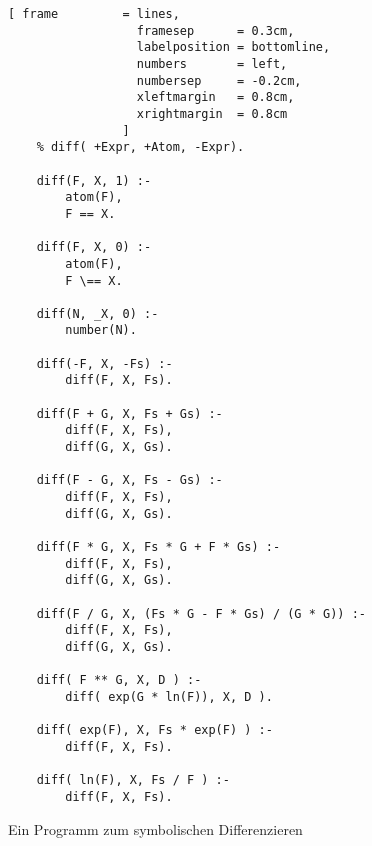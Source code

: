 \begin{figure}[!h]
  \centering
\begin{Verbatim}[ frame         = lines, 
                  framesep      = 0.3cm, 
                  labelposition = bottomline,
                  numbers       = left,
                  numbersep     = -0.2cm,
                  xleftmargin   = 0.8cm,
                  xrightmargin  = 0.8cm
                ]
    % diff( +Expr, +Atom, -Expr).
    
    diff(F, X, 1) :- 
        atom(F), 
        F == X.
    
    diff(F, X, 0) :- 
        atom(F),
        F \== X.
        
    diff(N, _X, 0) :-
        number(N).
    
    diff(-F, X, -Fs) :-
        diff(F, X, Fs).
    
    diff(F + G, X, Fs + Gs) :-
        diff(F, X, Fs),
        diff(G, X, Gs).
    
    diff(F - G, X, Fs - Gs) :-
        diff(F, X, Fs),
        diff(G, X, Gs).
    
    diff(F * G, X, Fs * G + F * Gs) :-
        diff(F, X, Fs),
        diff(G, X, Gs).
    
    diff(F / G, X, (Fs * G - F * Gs) / (G * G)) :-
        diff(F, X, Fs),
        diff(G, X, Gs).
    
    diff( F ** G, X, D ) :-
        diff( exp(G * ln(F)), X, D ).
    
    diff( exp(F), X, Fs * exp(F) ) :-
        diff(F, X, Fs).
    
    diff( ln(F), X, Fs / F ) :-
        diff(F, X, Fs).
\end{Verbatim}
\vspace*{-0.3cm}
  \caption{Ein Programm zum symbolischen Differenzieren}
  \label{fig:symbolisch-diff}
\end{figure}





